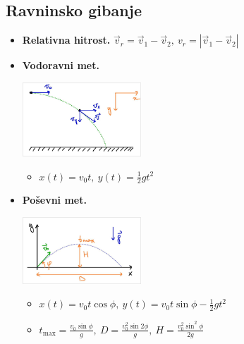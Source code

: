 \subsection{Ravninsko gibanje}
\begin{itemize}
    \item \textbf{Relativna hitrost.} \(\vec{v}_r = \vec{v}_1 - \vec{v}_2, \ v_r = |\vec{v}_1 - \vec{v}_2|\)
    
    \item \textbf{Vodoravni met.}
    \begin{center}
        \includegraphics[width=0.35\textwidth]{img/01_001.jpg}      
    \end{center}
    \begin{itemize}
        \item \(\boxed{x(t) = v_0 t, \ y(t) = \frac{1}{2}gt^2}\)
    \end{itemize}
    
    \item \textbf{Poševni met.}
    \begin{center}
        \includegraphics[width=0.35\textwidth]{img/01_002.jpg}      
    \end{center}
    \begin{itemize}
        \item \(\boxed{x(t) = v_0 t \cos \phi, \ y(t) = v_0 t \sin \phi - \frac{1}{2}gt^2}\)
        \item \(\boxed{t_\text{max} = \frac{v_0 \sin \phi}{g}, \ D = \frac{v_0^2 \sin 2 \phi}{g}, \ H = \frac{v_0^2\sin^2 \phi}{2g}}\)
    \end{itemize}
\end{itemize}

